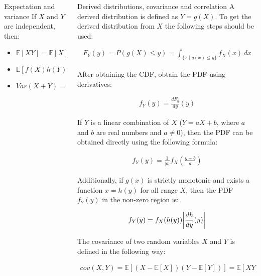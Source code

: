 \documentclass{beamer}
\begin{document}
\begin{frame}
\begin{columns}
\begin{column}{0.3\textwidth}
\begin{block}{Expectation and variance}
If $X$ and $Y$ are independent, then:

\begin{itemize}
    \item $\mathbb{E}[XY] = \mathbb{E}[X]\mathbb{E}[Y]$
    \item $\mathbb{E}[f(X)h(Y)] = \mathbb{E}[f(X)]\mathbb{E}[h(Y)]$
    \item $Var(X + Y) = Var(X) + Var(Y)$
\end{itemize}

\end{block}
\end{column}

\begin{column}{0.3\textwidth}
\begin{block}{Derived distributions, covariance and correlation}
A derived distribution is defined as $Y = g(X)$. To get the derived distribution from $X$ the following steps should be used:

\begin{align*}
   F_Y(y) = P(g(X) \leq y) = \int_{\{x \mid g(x) \leq y\}}  f_X(x) \,dx
\end{align*}

After obtaining the CDF, obtain the PDF using derivatives:

\begin{align*}
    f_Y(y) = \frac{dF_y}{dy}(y)
\end{align*}

If $Y$ is a linear combination of $X$ ($Y = aX + b$, where $a$ and $b$ are real numbers and $a \neq 0$), then the PDF can be obtained directly using the following formula:

\begin{align*}
    f_Y(y) = \frac{1}{|a|} f_X(\frac{y - b}{a})
\end{align*}

Additionally, if $g(x)$ is strictly monotonic and exists a function $x = h(y)$ for all range $X$, then the PDF $f_Y(y)$ in the non-zero region is:

\begin{align*}
    f_Y(y) = f_X(h(y))\abs{\frac{dh}{dy}(y)}
\end{align*}

The covariance of two random variables $X$ and $Y$ is defined in the following way:

\begin{align*}
    cov(X, Y) = \mathbb{E}[(X - \mathbb{E}[X])(Y - \mathbb{E}[Y])] = \mathbb{E}[XY] - \mathbb{E}[X]\mathbb{E}[Y]
\end{align*}


\end{block}
\end{column}
\end{columns}
\end{frame}
\end{document}
